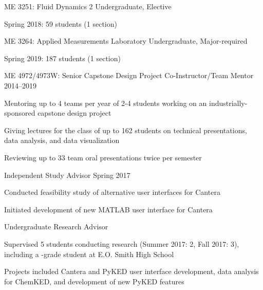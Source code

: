 \begin{outerlist}
\item ME 3251: Fluid Dynamics 2 \hfill Undergraduate, Elective
\begin{innerlist}
    \item Spring 2018: 59 students (1 section)
\end{innerlist}

\item ME 3264: Applied Measurements Laboratory \hfill Undergraduate, Major-required
\begin{innerlist}
    \item Spring 2019: 187 students (1 section)
\end{innerlist}

\item ME 4972/4973W: Senior Capstone Design Project Co-Instructor/Team Mentor \hfill 2014--2019
\begin{innerlist}
    \item Mentoring up to 4 teams per year of 2-4 students working on an
    industrially-sponsored capstone design project
    \item Giving lectures for the class of up to 162 students on technical presentations,
    data analysis, and data visualization
    \item Reviewing up to 33 team oral presentations twice per semester
\end{innerlist}

\item Independent Study Advisor \hfill Spring 2017
\begin{innerlist}
    \item Conducted feasibility study of alternative user interfaces for Cantera
    \item Initiated development of new \textsc{MATLAB} user interface for Cantera
\end{innerlist}

\item Undergraduate Research Advisor
\begin{innerlist}
    \item Supervised 5 students conducting research (Summer 2017: 2, Fall 2017: 3), including a -grade student at E.O. Smith High School
    \item Projects included Cantera and PyKED user interface development, data analysis for ChemKED, and development of new PyKED features
\end{innerlist}

\end{outerlist}

